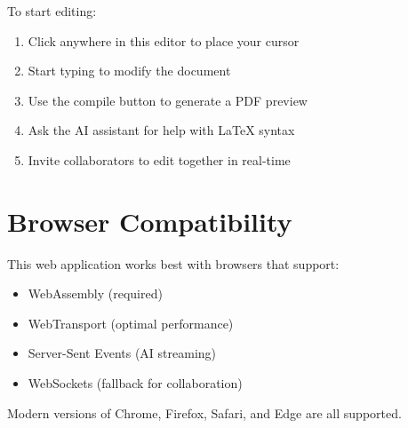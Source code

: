 \documentclass{article}
\begin{document}
To start editing:
\begin{enumerate}
    \item Click anywhere in this editor to place your cursor
    \item Start typing to modify the document
    \item Use the compile button to generate a PDF preview
    \item Ask the AI assistant for help with LaTeX syntax
    \item Invite collaborators to edit together in real-time
\end{enumerate}

\section{Browser Compatibility}

This web application works best with browsers that support:
\begin{itemize}
    \item WebAssembly (required)
    \item WebTransport (optimal performance)
    \item Server-Sent Events (AI streaming)
    \item WebSockets (fallback for collaboration)
\end{itemize}

Modern versions of Chrome, Firefox, Safari, and Edge are all supported.
\end{document}
